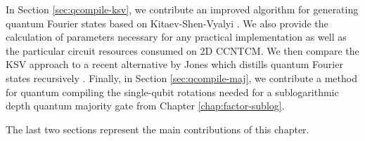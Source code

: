 In Section \ref{sec:qcompile-ksv}, we contribute an improved
algorithm for generating quantum Fourier states based on
Kitaev-Shen-Vyalyi \cite{Kitaev2002}. We also provide the calculation of
parameters necessary for any practical implementation as well as
the particular circuit resources consumed on \textsf{2D CCNTCM}.
We then compare the KSV approach to a recent alternative
by Jones which distills quantum Fourier states recursively \cite{Jones2013}.
Finally, in Section \ref{sec:qcompile-maj}, we contribute a method for
quantum compiling the single-qubit rotations needed for a
sublogarithmic depth quantum majority gate from Chapter \ref{chap:factor-sublog}.

The last two sections represent the main contributions of this chapter.


















%
